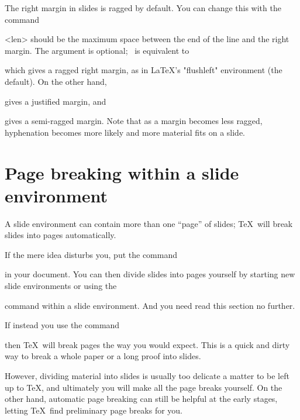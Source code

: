 The right margin in slides is ragged by default. You can change this with the
command
\begin{MD}
  \raggedslides[len]
\end{MD}
<len> should be the maximum space between the end of the line and the right
margin. The argument is optional; \n\raggedslides\ is equivalent to
\begin{LVerbatim}
  \raggedslides[1fil]
\end{LVerbatim}
which gives a ragged right margin, as in \LaTeX's "flushleft" environment (the
default). On the other hand,
\begin{LVerbatim}
  \raggedslides[0pt]
\end{LVerbatim}
gives a justified margin, and
\begin{LVerbatim}
  \raggedslides[2em]
\end{LVerbatim}
gives a semi-ragged margin. Note that as a margin becomes less ragged,
hyphenation becomes more likely and more material fits on a slide.

\section{Page breaking within a slide environment\label{S-pagebreak}}

A slide environment can contain more than one ``page'' of slides; \TeX\ will
break slides into pages automatically.

If the mere idea disturbs you, put the command
\begin{LVerbatim}
  \extraslideheight{10in}
\end{LVerbatim}
in your document. You can then divide slides into pages yourself by starting
new slide environments or using the
\begin{MD}
  \newslide
\end{MD}
command within a slide environment. And you need read this section no further.

If instead you use the command
\begin{LVerbatim}
  \extraslideheight{0pt}
\end{LVerbatim}
then \TeX\ will break pages the way you would expect. This is a quick and
dirty way to break a whole paper or a long proof into slides.

However, dividing material into slides is usually too delicate a matter to be
left up to \TeX, and ultimately you will make all the page breaks yourself. On
the other hand, automatic page breaking can still be helpful at the early
stages, letting \TeX\ find preliminary page breaks for you.

